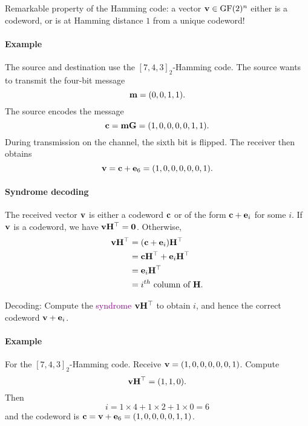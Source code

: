 \documentclass[a4paper, 11pt, openany]{book}
\numberwithin{equation}{section}
\theoremstyle{plain}
\theoremstyle{definition}
\newcommand{\GF}{\mathrm{GF}}
\newcommand{\Define}[1]{\textcolor{purple}{#1}}
\begin{document}
Remarkable property of the Hamming code: a vector ${\bf v} \in \GF(2)^n$ either is a codeword, or is at Hamming distance $1$ from a unique codeword!


\paragraph{Example}
The source and destination use the $[7,4,3]_2$-Hamming code. The source wants to transmit the four-bit message 
\[
	{\bf m} = (0,0,1,1).
\]
The source encodes the message 
\[
    {\bf c} = {\bf m}{\bf G} = (1,0,0,0,0,1,1).
\]
During transmission on the channel, the sixth bit is flipped. The receiver then obtains
\[
    {\bf v} = {\bf c} + {\bf e}_6 = (1,0,0,0,0,0,1).
\]



\paragraph{Syndrome decoding}
The received vector ${\bf v}$ is either a codeword ${\bf c}$ or of the form ${\bf c} + {\bf e}_i$ for some $i$. If ${\bf v}$ is a codeword, we have ${\bf v}{\bf H}^\top = {\bf 0}$. Otherwise,
\begin{align*}
	{\bf v}{\bf H}^\top &= ({\bf c}+{\bf e}_i){\bf H}^\top\\
	&= {\bf c}{\bf H}^\top + {\bf e}_i{\bf H}^\top\\
	&= {\bf e}_i{\bf H}^\top\\
	&= i^{th} \mbox{ column of } {\bf H}.
\end{align*}

Decoding: Compute the \Define{syndrome} ${\bf v}{\bf H}^\top$ to obtain $i$, and hence the correct codeword ${\bf v} + {\bf e}_i$.


\paragraph{Example}
For the $[7,4,3]_2$-Hamming code. Receive ${\bf v} = (1,0,0,0,0,0,1)$.
Compute
\[
	{\bf v}{\bf H}^\top = (1,1,0).
\]
Then 
\[
    i = 1 \times 4 + 1 \times 2 + 1 \times 0 = 6
\]
and the codeword is ${\bf c} = {\bf v} + {\bf e}_6 = (1,0,0,0,0,1,1)$.
\end{document}
